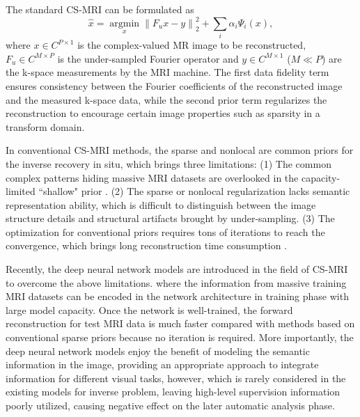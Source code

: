 \documentclass[runningheads]{llncs}
\begin{document}
\vspace{-10mm}

The standard CS-MRI can be formulated as
\begin{equation}\label{eq1}
\hat x = \mathop {\arg \min }\limits_x \left\| {{F_u}x - y} \right\|_2^2 + \sum\limits_i {{\alpha _i}{\Psi _i}\left( x \right)},
\end{equation}
where $x \in {C^{P \times 1}}$ is the complex-valued MR image to be reconstructed, $F_u\in {C^{M \times P}}$ is the under-sampled Fourier operator and $y\in {C^{M \times 1}}$ ($M\ll P$) are the k-space measurements by the MRI machine. The first data fidelity term ensures consistency between the Fourier coefficients of the reconstructed image and the measured k-space data, while the second prior term regularizes the reconstruction to encourage certain image properties such as sparsity in a transform domain.

In conventional CS-MRI methods, the sparse and nonlocal are common priors for the inverse recovery in situ, which brings three limitations: (1) The common complex patterns hiding massive MRI datasets are overlooked in the capacity-limited ``shallow" prior \cite{4}. (2) The sparse or nonlocal regularization lacks semantic representation ability, which is difficult to distinguish between the image structure details and structural artifacts brought by under-sampling. (3) The optimization for conventional priors requires tons of iterations to reach the convergence, which brings long reconstruction time consumption \cite{5}.

Recently, the deep neural network models are introduced in the field of CS-MRI to overcome the above limitations. where the information from massive training MRI datasets can be encoded in the network architecture in training phase with large model capacity. Once the network is well-trained, the forward reconstruction for test MRI data is much faster compared with methods based on conventional sparse priors because no iteration is required. More importantly, the deep neural network models enjoy the benefit of modeling the semantic information in the image, providing an appropriate approach to integrate information for different visual tasks, however, which is rarely considered in the existing models for inverse problem, leaving high-level supervision information poorly utilized, causing negative effect on the later automatic analysis phase.
\end{document}
